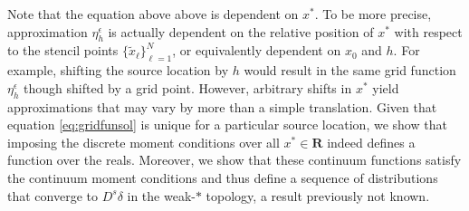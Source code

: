 Note that the equation above above is dependent on $x^*$.
To be more precise, approximation $\eta_h^\epsilon$ is actually dependent on the relative position of $x^*$ with respect to the stencil points $\{\tilde x_\ell\}_{\ell=1}^N$, or equivalently dependent on $x_0$ and $h$.
For example, shifting the source location by $h$ would result in the same grid function $\eta_h^\epsilon$ though shifted by a grid point.
However, arbitrary shifts in $x^*$ yield approximations that may vary by more than a simple translation.
Given that equation \ref{eq:gridfunsol} is unique for a particular source location, we show that imposing the discrete moment conditions over all $x^*\in\mathbf R$ indeed defines a function over the reals.
Moreover, we show that these continuum functions satisfy the continuum moment conditions and thus define a sequence of distributions that converge to $D^{s}\delta$ in the weak-$*$ topology, a result previously not known.

